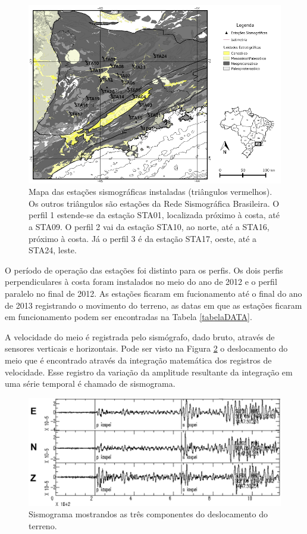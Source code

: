 \begin{figure}[!ht]
\centering
\includegraphics[scale=0.5]{Figs/mapa_das_estacoes_simosgraficas_instaladas.png}
\caption{Mapa das estações sismográficas instaladas (triângulos vermelhos). Os outros triângulos são estações da Rede Sismográfica Brasileira. O perfil 1 estende-se da estação STA01, localizada próximo à costa, até a STA09. O perfil 2 vai da estação STA10, ao norte, até a STA16, próximo à costa. Já o perfil 3 é da estação STA17, oeste, até a STA24, leste.}
\label{map_loc}
\end{figure}

O período de operação das estações foi distinto para os perfis. Os dois perfis perpendiculares à costa foram instalados no meio do ano de 2012 e o perfil paralelo no final de 2012. As estações ficaram em fucionamento até o final do ano de 2013 registrando o movimento do terreno, as datas em que as estações ficaram em funcionamento podem ser encontradas na Tabela \ref{tabelaDATA}. 

A velocidade do meio é registrada pelo sismógrafo, dado bruto, através de sensores verticais e horizontais. Pode ser visto na Figura \ref{simograma} o deslocamento do meio que é encontrado através da integração matemática dos registros de velocidade. Esse registro da variação da amplitude resultante da integração em uma série temporal é chamado de sismograma. 

\begin{figure}[!ht]
\centering
\includegraphics[scale=0.6]{Figs/sismograma.png}
\caption{Sismograma mostrandos as três componentes do deslocamento do terreno.}
\label{simograma}
\end{figure}

